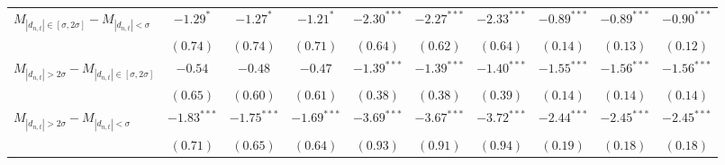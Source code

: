 \begin{tabular}{lccccccccc}
 \hline$M_{|d_{n,t}| \in [\sigma, 2\sigma]} - M_{|d_{n,t}| < \sigma}$ & $-1.29^{*}$ & $-1.27^{*}$ & $-1.21^{*}$ & $-2.30^{***}$ & $-2.27^{***}$ & $-2.33^{***}$ & $-0.89^{***}$ & $-0.89^{***}$ & $-0.90^{***}$ \\ 
   & $(0.74)$ & $(0.74)$ & $(0.71)$ & $(0.64)$ & $(0.62)$ & $(0.64)$ & $(0.14)$ & $(0.13)$ & $(0.12)$ \\ 
  $M_{|d_{n,t}| > 2 \sigma} - M_{|d_{n,t}| \in [\sigma, 2\sigma]}$ & $-0.54$ & $-0.48$ & $-0.47$ & $-1.39^{***}$ & $-1.39^{***}$ & $-1.40^{***}$ & $-1.55^{***}$ & $-1.56^{***}$ & $-1.56^{***}$ \\ 
   & $(0.65)$ & $(0.60)$ & $(0.61)$ & $(0.38)$ & $(0.38)$ & $(0.39)$ & $(0.14)$ & $(0.14)$ & $(0.14)$ \\ 
  $M_{|d_{n,t}| > 2 \sigma} - M_{|d_{n,t}| < \sigma}$ & $-1.83^{***}$ & $-1.75^{***}$ & $-1.69^{***}$ & $-3.69^{***}$ & $-3.67^{***}$ & $-3.72^{***}$ & $-2.44^{***}$ & $-2.45^{***}$ & $-2.45^{***}$ \\ 
   & $(0.71)$ & $(0.65)$ & $(0.64)$ & $(0.93)$ & $(0.91)$ & $(0.94)$ & $(0.19)$ & $(0.18)$ & $(0.18)$ \\ 
   \hline 
\end{tabular}
